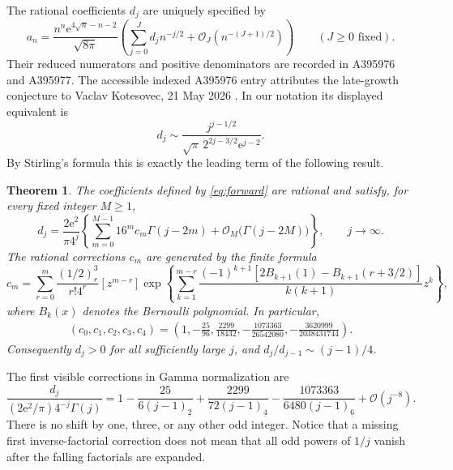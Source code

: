\documentclass[11pt,letterpaper]{article}
\numberwithin{equation}{section}
\newtheorem{theorem}{Theorem}[section]
\theoremstyle{remark}\newtheorem{remark}[theorem]{Remark}
\newcommand{\e}{\mathrm e}
\newcommand{\Ord}{\mathcal O}
\newcommand{\fall}[2]{(#1)_{\underline{#2}}}
\begin{document}
The rational coefficients $d_j$ are uniquely specified by
\begin{equation}\label{eq:forward}
 a_n=\frac{n^n\e^{4\sqrt n-n-2}}{\sqrt{8\pi}}
 \left(\sum_{j=0}^{J}d_j n^{-j/2}+\Ord_J(n^{-(J+1)/2})\right)
 \qquad(J\ge0\text{ fixed}).
\end{equation}
Their reduced numerators and positive denominators are recorded in A395976 and A395977. The accessible indexed A395976 entry attributes the late-growth conjecture to Vaclav Kotesovec, 21 May 2026 \cite{oeis336,oeis395976,oeis395977}. In our notation its displayed equivalent is
\begin{equation}\label{eq:oeis}
 d_j\sim\frac{j^{j-1/2}}{\sqrt\pi\,2^{2j-3/2}\e^{j-2}}.
\end{equation}
By Stirling's formula this is exactly the leading term of the following result.

\begin{theorem}\label{thm:main}
The coefficients defined by \eqref{eq:forward} are rational and satisfy, for every fixed integer $M\ge1$,
\begin{equation}\label{eq:main}
 d_j=\frac{2\e^2}{\pi4^j}
 \left\{\sum_{m=0}^{M-1}16^m c_m\Gamma(j-2m)
                  +\Ord_M\bigl(\Gamma(j-2M)\bigr)\right\},\qquad j\to\infty.
\end{equation}
The rational corrections $c_m$ are generated by the finite formula
\begin{equation}\label{eq:cm}
 c_m=\sum_{r=0}^{m}\frac{(1/2)_r^3}{r!4^r}
 [z^{m-r}]\exp\!\left\{
 \sum_{k=1}^{m-r}\frac{(-1)^{k+1}
 [2B_{k+1}(1)-B_{k+1}(r+3/2)]}{k(k+1)}z^k\right\},
\end{equation}
where $B_k(x)$ denotes the Bernoulli polynomial. In particular,
\begin{align}\label{eq:cfirst}
 (c_0,c_1,c_2,c_3,c_4)
 =\left(1,-\frac{25}{96},\frac{2299}{18432},
       -\frac{1073363}{26542080},-\frac{3620999}{2038431744}\right).
\end{align}
Consequently $d_j>0$ for all sufficiently large $j$, and $d_j/d_{j-1}\sim(j-1)/4$.
\end{theorem}
The first visible corrections in Gamma normalization are
\begin{equation}\label{eq:normalized}
 \frac{d_j}{(2\e^2/\pi)4^{-j}\Gamma(j)}
 =1-\frac{25}{6\fall{j-1}{2}}+
 \frac{2299}{72\fall{j-1}{4}}-
 \frac{1073363}{6480\fall{j-1}{6}}+\Ord(j^{-8}).
\end{equation}
There is no shift by one, three, or any other odd integer. Notice that a missing first inverse-factorial correction does not mean that all odd powers of $1/j$ vanish after the falling factorials are expanded.
\end{document}
